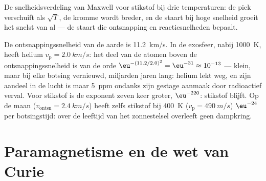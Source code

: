\begin{omfigure}

{\small De snelheidsverdeling van Maxwell voor stikstof bij drie
temperaturen: de piek verschuift als $\sqrt T$, de kromme wordt breder, en de
staart bij hoge snelheid groeit het snelst van al --- de staart die ontsnapping
en reactiesnelheden bepaalt.}
\end{omfigure}

\begin{example}\label{ex:b2:boltzmann-factor:escape}
De ontsnappingssnelheid van de aarde is \qty{11.2}{km/s}. In de exosfeer, nabij
\qty{1000}{K}, heeft helium $v_{\text{p}} = \qty{2.0}{km/s}$: het deel van de
atomen boven de ontsnappingssnelheid is van de orde
$\eu^{-(11.2/2.0)^2} = \eu^{-31}
\approx 10^{-13}$ --- klein, maar bij elke
botsing vernieuwd, miljarden
jaren lang: helium lekt weg, en zijn aandeel in de lucht is maar
\qty{5}{ppm} ondanks zijn gestage aanmaak door radioactief verval. Voor
stikstof is de exponent zeven keer groter, $\eu^{-220}$: stikstof blijft.
Op de maan ($v_{\text{ontsn}} = \qty{2.4}{km/s}$) heeft zelfs stikstof bij
\qty{400}{K} ($v_{\text{p}} = \qty{490}{m/s}$) $\eu^{-24}$ per botsingstijd:
over de leeftijd van het zonnestelsel overleeft geen dampkring.
\end{example}

\section{Paramagnetisme en de wet van Curie}

